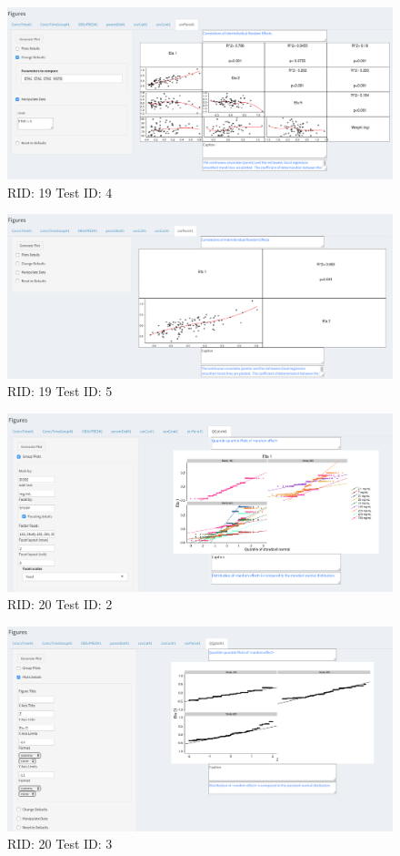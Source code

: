 \begin{figure}[H]
\includegraphics[width=.8\textwidth]{screencaps/19-4-1.png}
\caption{RID: 19 Test ID: 4}
\end{figure}
\begin{figure}[H]
\includegraphics[width=.8\textwidth]{screencaps/19-5-1.png}
\caption{RID: 19 Test ID: 5}
\end{figure}
\begin{figure}[H]
\includegraphics[width=.8\textwidth]{screencaps/20-2-1.png}
\caption{RID: 20 Test ID: 2}
\end{figure}
\begin{figure}[H]
\includegraphics[width=.8\textwidth]{screencaps/20-3-1.png}
\caption{RID: 20 Test ID: 3}
\end{figure}
